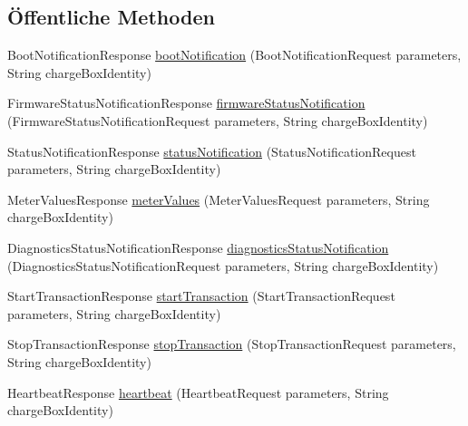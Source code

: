 \subsection*{Öffentliche Methoden}
\begin{DoxyCompactItemize}
\item 
Boot\-Notification\-Response \hyperlink{classde_1_1rwth_1_1idsg_1_1steve_1_1ocpp_1_1soap_1_1_central_system_service15___soap_server_af2c170858b55e319db3e64a1427da7f8}{boot\-Notification} (Boot\-Notification\-Request parameters, String charge\-Box\-Identity)
\item 
Firmware\-Status\-Notification\-Response \hyperlink{classde_1_1rwth_1_1idsg_1_1steve_1_1ocpp_1_1soap_1_1_central_system_service15___soap_server_a170e37cb6366b50dcad3e954c7d27034}{firmware\-Status\-Notification} (Firmware\-Status\-Notification\-Request parameters, String charge\-Box\-Identity)
\item 
Status\-Notification\-Response \hyperlink{classde_1_1rwth_1_1idsg_1_1steve_1_1ocpp_1_1soap_1_1_central_system_service15___soap_server_a96ddf45ec00173f839f4e52ee72d25d2}{status\-Notification} (Status\-Notification\-Request parameters, String charge\-Box\-Identity)
\item 
Meter\-Values\-Response \hyperlink{classde_1_1rwth_1_1idsg_1_1steve_1_1ocpp_1_1soap_1_1_central_system_service15___soap_server_a77978b642acaa9035e624f4acfe7ccb3}{meter\-Values} (Meter\-Values\-Request parameters, String charge\-Box\-Identity)
\item 
Diagnostics\-Status\-Notification\-Response \hyperlink{classde_1_1rwth_1_1idsg_1_1steve_1_1ocpp_1_1soap_1_1_central_system_service15___soap_server_a6980afd8e37aa7900f3cb45745dd0f0f}{diagnostics\-Status\-Notification} (Diagnostics\-Status\-Notification\-Request parameters, String charge\-Box\-Identity)
\item 
Start\-Transaction\-Response \hyperlink{classde_1_1rwth_1_1idsg_1_1steve_1_1ocpp_1_1soap_1_1_central_system_service15___soap_server_a7424e7f52ac5c3350030ae0a82d845ec}{start\-Transaction} (Start\-Transaction\-Request parameters, String charge\-Box\-Identity)
\item 
Stop\-Transaction\-Response \hyperlink{classde_1_1rwth_1_1idsg_1_1steve_1_1ocpp_1_1soap_1_1_central_system_service15___soap_server_a943d3672725a4fcf5159d3196a8a51c3}{stop\-Transaction} (Stop\-Transaction\-Request parameters, String charge\-Box\-Identity)
\item 
Heartbeat\-Response \hyperlink{classde_1_1rwth_1_1idsg_1_1steve_1_1ocpp_1_1soap_1_1_central_system_service15___soap_server_a3101185e68830b49b9f2bd362bec7a34}{heartbeat} (Heartbeat\-Request parameters, String charge\-Box\-Identity)

\end{DoxyCompactItemize}
